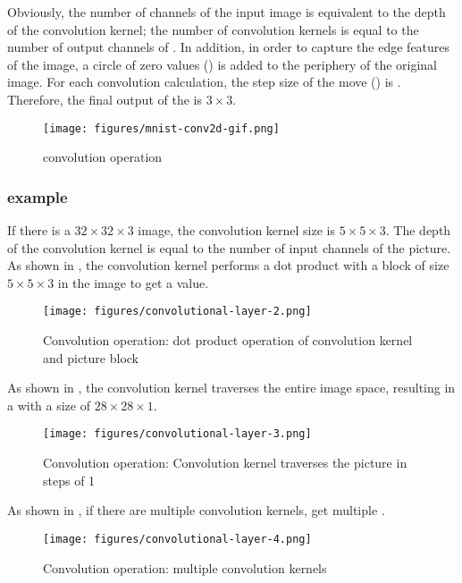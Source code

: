 \begin{content}
\begin{content}
Obviously, the number of channels of the input image is equivalent to the depth of the convolution kernel; the number of convolution kernels is equal to the number of output channels of . In addition, in order to capture the edge features of the image, a circle of zero values ​​() is added to the periphery of the original image. For each convolution calculation, the step size of the move () is . Therefore, the final output of the  is $3 \times 3$.

\begin{figure}[H]
\centering
\texttt{[image: figures/mnist-conv2d-gif.png]}
\caption{convolution operation}
 \label{fig:mnist-conv2d-gif}
\end{figure}

\subsubsection{example}

If there is a $32 \times 32 \times 3$ image, the convolution kernel size is $5 \times 5 \times 3$. The depth of the convolution kernel is equal to the number of input channels of the picture. As shown in , the convolution kernel performs a dot product with a block of size $5 \times 5 \times 3$ in the image to get a value.

\begin{figure}[H]
\centering
\texttt{[image: figures/convolutional-layer-2.png]}
\caption{Convolution operation: dot product operation of convolution kernel and picture block}
 \label{fig:mnist-conv-1dot}
\end{figure}

As shown in , the convolution kernel traverses the entire image space, resulting in a  with a size of $28 \times 28 \times 1$.

\begin{figure}[H]
\centering
\texttt{[image: figures/convolutional-layer-3.png]}
\caption{Convolution operation: Convolution kernel traverses the picture in steps of 1}
 \label{fig:mnist-conv-ndot}
\end{figure}

As shown in , if there are multiple convolution kernels, get multiple .

\begin{figure}[H]
\centering
\texttt{[image: figures/convolutional-layer-4.png]}
\caption{Convolution operation: multiple convolution kernels}
 \label{fig:mnist-conv-multi-filters}
\end{figure}


\end{content}
\end{content}
